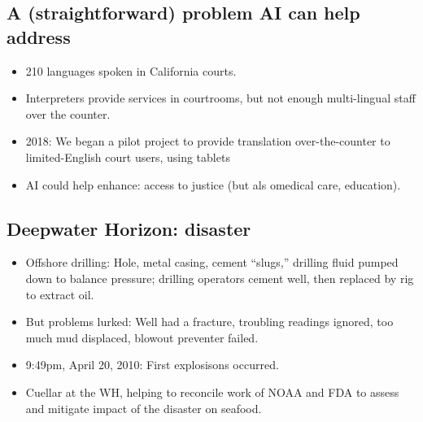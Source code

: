 \documentclass{article}
\begin{document}
\subsection{A (straightforward) problem AI can help address}

\begin{itemize}
  \item 210 languages spoken in California courts.
  \item Interpreters provide services in courtrooms, but not enough multi-lingual staff over the counter.
  \item 2018: We began a pilot project to provide translation over-the-counter to limited-English court users, using tablets
  \item AI could help enhance: access to justice (but als omedical care, education).
\end{itemize}

\subsection{Deepwater Horizon: disaster}

\begin{itemize}
  \item Offshore drilling: Hole, metal casing, cement ``slugs,'' drilling fluid pumped down to balance pressure; drilling operators cement well, then replaced by rig to extract oil.
  \item But problems lurked: Well had a fracture, troubling readings ignored, too much mud displaced, blowout preventer failed.
  \item 9:49pm, April 20, 2010: First explosisons occurred.
  \item Cuellar at the WH, helping to reconcile work of NOAA and FDA to assess and mitigate impact of the disaster on seafood.
\end{itemize}
\end{document}
